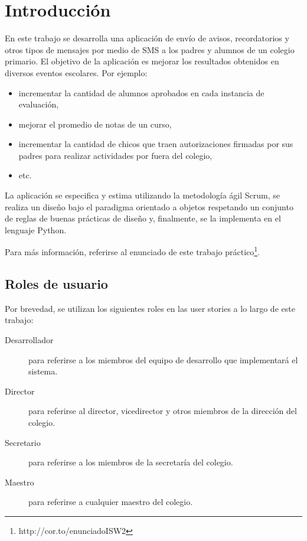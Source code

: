 \documentclass[a4paper, 10pt, twoside]{article}
\begin{document}
\newpage

\tableofcontents

\newpage




\section{Introducción}

En este trabajo se desarrolla una aplicación de envío de avisos, recordatorios y otros tipos de mensajes por medio de SMS a los padres y alumnos de un colegio primario. El objetivo de la aplicación es mejorar los resultados obtenidos en diversos eventos escolares. Por ejemplo:

\begin{itemize}
  \item incrementar la cantidad de alumnos aprobados en cada instancia de evaluación,
  \item mejorar el promedio de notas de un curso,
  \item incrementar la cantidad de chicos que traen autorizaciones firmadas por sus padres para realizar actividades por fuera del colegio,
  \item etc.
\end{itemize}

La aplicación se especifica y estima utilizando la metodología ágil Scrum, se realiza un diseño bajo el paradigma orientado a objetos respetando un conjunto de reglas de buenas prácticas de diseño y, finalmente, se la implementa en el lenguaje Python.

Para más información, referirse al enunciado de este trabajo práctico\footnote{http://cor.to/enunciadoISW2}.


\subsection{Roles de usuario}

Por brevedad, se utilizan los siguientes roles en las user stories a lo largo de este trabajo:

\begin{description}
  \item[Desarrollador] para referirse a los miembros del equipo de desarrollo que implementará el sistema.

  \item[Director] para referirse al director, vicedirector y otros miembros de la dirección del colegio.

  \item[Secretario] para referirse a los miembros de la secretaría del colegio.

  \item[Maestro] para referirse a cualquier maestro del colegio.
\end{description}
\end{document}

